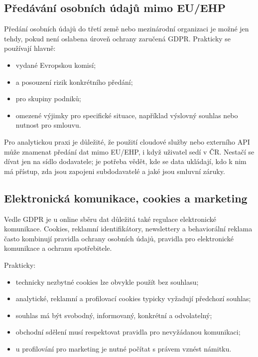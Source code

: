 \subsection{Předávání osobních údajů mimo EU/EHP}
Předání osobních údajů do třetí země nebo mezinárodní organizaci je možné jen tehdy, pokud není
oslabena úroveň ochrany zaručená GDPR. Prakticky se používají hlavně:
\begin{itemize}
  \item {} vydané Evropskou komisí;
  \item {} a posouzení rizik konkrétního předání;
  \item {} pro skupiny podniků;
  \item omezené výjimky pro specifické situace, například výslovný souhlas nebo nutnost pro smlouvu.
\end{itemize}

Pro analytickou praxi je důležité, že použití cloudové služby nebo externího API může znamenat předání
dat mimo EU/EHP, i když uživatel sedí v ČR. Nestačí se dívat jen na sídlo dodavatele; je potřeba vědět,
kde se data ukládají, kdo k nim má přístup, zda jsou zapojeni subdodavatelé a jaké jsou smluvní záruky.

\subsection{Elektronická komunikace, cookies a marketing}
Vedle GDPR je u online sběru dat důležitá také regulace elektronické komunikace. Cookies, reklamní
identifikátory, newslettery a behaviorální reklama často kombinují pravidla ochrany osobních údajů,
pravidla pro elektronické komunikace a ochranu spotřebitele.

Prakticky:
\begin{itemize}
  \item technicky nezbytné cookies lze obvykle použít bez souhlasu;
  \item analytické, reklamní a profilovací cookies typicky vyžadují předchozí souhlas;
  \item souhlas má být svobodný, informovaný, konkrétní a odvolatelný;
  \item obchodní sdělení musí respektovat pravidla pro nevyžádanou komunikaci;
  \item u profilování pro marketing je nutné počítat s právem vznést námitku.
\end{itemize}

